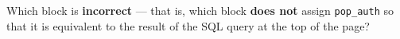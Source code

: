 \documentclass[twoside,12pt]{article}
\begin{document}
\begin{probset}
\begin{prob}[(10 pts)]
\begin{prob}[(4 pts)]
Which block is \textbf{incorrect} --- that is, which block \textbf{does not} assign \texttt{pop\_auth} so that it is equivalent to the result of the SQL query at the top of the page?





\end{prob}

\newpage

\begin{prob}[(8 pts)]


\end{prob}
\end{prob}
\end{probset}
\end{document}
